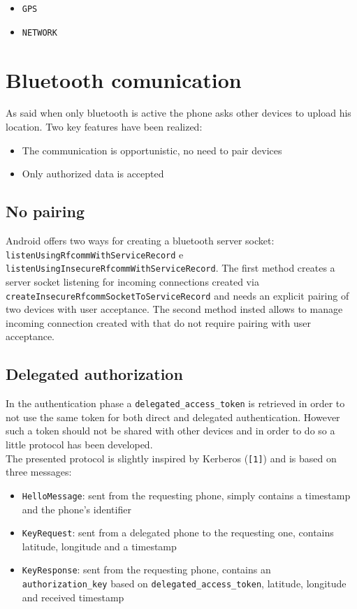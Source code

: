 \documentclass[conference]{IEEEtran}
\begin{document}
\begin{itemize}
	\item \texttt{GPS}
	\item \texttt{NETWORK}
\end{itemize}

\section{Bluetooth comunication}
As said when only bluetooth is active the phone asks other devices to upload his location. Two key features have been realized:\\

\begin{itemize}
	\item The communication is opportunistic, no need to pair devices
	\item Only authorized data is accepted\\
\end{itemize}

\subsection{No pairing}
Android offers two ways for creating a bluetooth server socket: \texttt{listenUsingRfcommWithServiceRecord} e \texttt{listenUsingInsecureRfcommWithServiceRecord}. The first method creates a server socket listening for incoming connections created via \texttt{createInsecureRfcommSocketToServiceRecord} and needs an explicit pairing of two devices with user acceptance. The second method insted allows to manage incoming connection created with \texttt{} that do not require pairing with user acceptance.\\

\subsection{Delegated authorization}
In the authentication phase a \texttt{delegated\allowbreak\_access\allowbreak\_token} is retrieved in order to not use the same token for both direct and delegated authentication. However such a token should not be shared with other devices and in order to do so a little protocol has been developed.\\
The presented protocol is slightly inspired by Kerberos (\texttt{[1]}) and is based on three messages:\\
\begin{itemize}
	\item \texttt{HelloMessage}: sent from the requesting phone, simply contains a timestamp and the phone's identifier
	\item \texttt{KeyRequest}: sent from a delegated phone to the requesting one, contains latitude, longitude and a timestamp
	\item \texttt{KeyResponse}: sent from the requesting phone, contains an \texttt{authorization\_key} based on \texttt{delegated\_access\_token}, latitude, longitude and received timestamp
\end{itemize}
\end{document}

